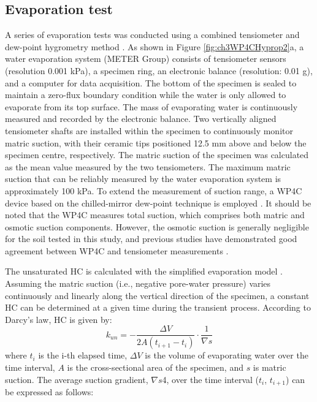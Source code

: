 \subsection{Evaporation test}
A series of evaporation tests was conducted using a combined tensiometer and dew-point hygrometry method \parencite{satyanagaMeasurementSoilwaterCharacteristic2019, changWaterTransferGranite2026}. As shown in Figure \ref{fig:ch3WP4CHyprop2}a, a water evaporation system (METER Group) consists of tensiometer sensors (resolution 0.001 kPa), a specimen ring, an electronic balance (resolution: 0.01 g), and a computer for data acquisition. The bottom of the specimen is sealed to maintain a zero-flux boundary condition while the water is only allowed to evaporate from its top surface. The mass of evaporating water is continuously measured and recorded by the electronic balance. Two vertically aligned tensiometer shafts are installed within the specimen to continuously monitor matric suction, with their ceramic tips positioned 12.5 mm above and below the specimen centre, respectively. The matric suction of the specimen was calculated as the mean value measured by the two tensiometers. The maximum matric suction that can be reliably measured by the water evaporation system is approximately 100 kPa. To extend the measurement of suction range, a WP4C device based on the chilled-mirror dew-point technique is employed \parencite{shokranaMeasurementSoilWater2020, changWaterTransferGranite2026}. It should be noted that the WP4C measures total suction, which comprises both matric and osmotic suction components. However, the osmotic suction is generally negligible for the soil tested in this study, and previous studies have demonstrated good agreement between WP4C and tensiometer measurements \parencite{aziziCouplingCyclicWater2023, dongHydrocharEffectsMicrostructure2025a}.\par
The unsaturated \ac{HC} is calculated with the simplified evaporation model \parencite{schindlerSimplifyingEvaporationMethod2006, petersSimplifiedEvaporationMethod2008}. Assuming the matric suction (i.e., negative pore-water pressure) varies continuously and linearly along the vertical direction of the specimen, a constant \ac{HC} can be determined at a given time during the transient process. According to Darcy’s law, \ac{HC} is given by:
\begin{equation}
    k_{un}=-\frac{\Delta V}{2A(t_{i+1}-t_{i})} \cdot \frac{1}{\nabla s}
\end{equation}
where $t_{i}$ is the i-th elapsed time, $\Delta V$ is the volume of evaporating water over the time interval, $A$ is the cross-sectional area of the specimen, and $s$ is matric suction. The average suction gradient, $\nabla s$4, over the time interval ($t_{i}$, $t_{i+1}$) can be expressed as follows:
